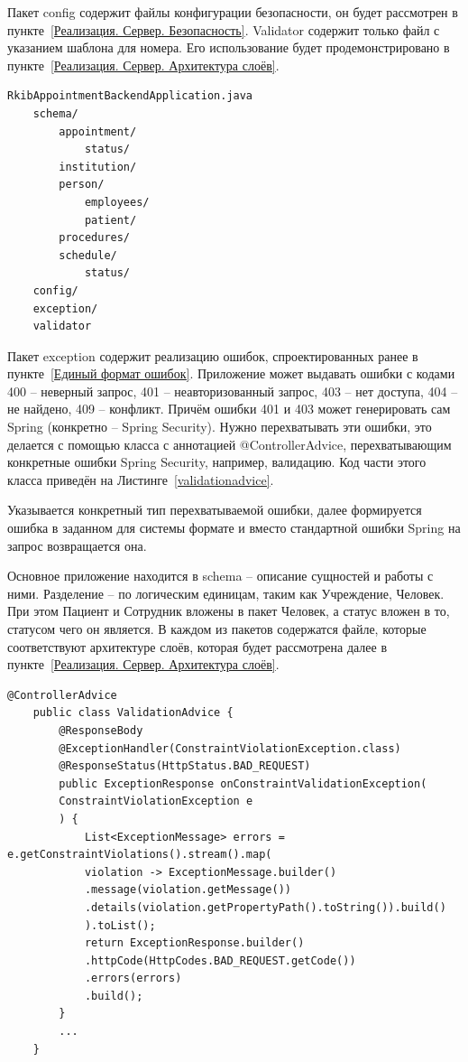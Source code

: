 \documentclass[a4paper,article]{article}
\begin{document}
\begin{sloppypar}
    Пакет config содержит файлы конфигурации безопасности, он будет рассмотрен в пункте~\ref{Реализация. Сервер. Безопасность}. Validator содержит только файл с указанием шаблона для номера. Его использование будет продемонстрировано в пункте~\ref{Реализация. Сервер. Архитектура слоёв}.
    
    \newpage

    \begin{lstlisting}[label=backendprojectstructure,caption=Структура серверного приложения]
    RkibAppointmentBackendApplication.java
    schema/
        appointment/
            status/
        institution/
        person/
            employees/
            patient/
        procedures/
        schedule/
            status/
    config/
    exception/
    validator
    \end{lstlisting}

    Пакет exception содержит реализацию ошибок, спроектированных ранее в пункте~\ref{Единый формат ошибок}. Приложение может выдавать ошибки с кодами 400 -- неверный запрос, 401 -- неавторизованный запрос, 403 -- нет доступа, 404 -- не найдено, 409 -- конфликт. Причём ошибки 401 и 403 может генерировать сам Spring (конкретно -- Spring Security). Нужно перехватывать эти ошибки, это делается с помощью класса с аннотацией @ControllerAdvice, перехватывающим конкретные ошибки Spring Security, например, валидацию. Код части этого класса приведён на Листинге~\ref{validationadvice}.
    
    Указывается конкретный тип перехватываемой ошибки, далее формируется ошибка в заданном для системы формате и вместо стандартной ошибки Spring на запрос возвращается она.
    
    Основное приложение находится в schema -- описание сущностей и работы с ними. Разделение -- по логическим единицам, таким как Учреждение, Человек. При этом Пациент и Сотрудник вложены в пакет Человек, а статус вложен в то, статусом чего он является. В каждом из пакетов содержатся файле, которые соответствуют архитектуре слоёв, которая будет рассмотрена далее в пункте~\ref{Реализация. Сервер. Архитектура слоёв}.
    
    \newpage

    \begin{lstlisting}[label=validationadvice,caption=Класс-прехватчик ошибок Spring]
    @ControllerAdvice
    public class ValidationAdvice {
        @ResponseBody
        @ExceptionHandler(ConstraintViolationException.class)
        @ResponseStatus(HttpStatus.BAD_REQUEST)
        public ExceptionResponse onConstraintValidationException(
        ConstraintViolationException e
        ) {
            List<ExceptionMessage> errors = e.getConstraintViolations().stream().map(
            violation -> ExceptionMessage.builder()
            .message(violation.getMessage())
            .details(violation.getPropertyPath().toString()).build()
            ).toList();
            return ExceptionResponse.builder()
            .httpCode(HttpCodes.BAD_REQUEST.getCode())
            .errors(errors)
            .build();
        }
        ...
    }
    \end{lstlisting}


\end{sloppypar}
\end{document}
